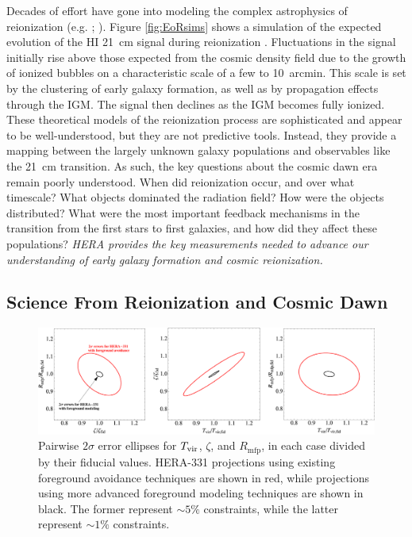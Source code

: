 \documentclass[preprint]{aastex}
\newcommand{\Mycitep}[1]{{\bf \citep{#1}}}
\newcommand{\Mycitealt}[1]{{\bf \citealt{#1}}}
\newcommand{\compress}{\vspace{-0.25in}}
\newcommand{\Caption}[4]{\vspace{#1}\renewcommand{\baselinestretch}{#2}\caption{#4}\vspace{#3}}
\begin{document}
Decades of effort have gone into modeling the complex astrophysics of reionization
(e.g. \citealt{shapiro_giroux1987, haiman_loeb1997}; \Mycitealt{furlanetto_et_al2004, santos_et_al2010}). Figure \ref{fig:EoRsims} shows a 
simulation of the expected evolution of the HI 21~cm signal during reionization \Mycitep{mesinger_furlanetto2007}. Fluctuations in the signal initially 
rise above those expected from the cosmic density field due to the growth of ionized bubbles on a characteristic 
scale of a few to 10~arcmin. This scale is set by the clustering of early galaxy formation, as well as by 
propagation effects through the IGM. The signal then declines as the IGM becomes fully ionized.  These theoretical 
models of the reionization process are sophisticated and appear to be well-understood, but they are not 
predictive tools. Instead, they provide a mapping between the largely unknown galaxy populations and observables 
like the 21~cm transition. As such, the key questions about the cosmic dawn era remain poorly understood.  When 
did reionization occur, and over what timescale?  What objects dominated the radiation field?  How were the 
objects distributed?  What were the most important feedback mechanisms in the transition from the first stars to
first galaxies, and how did they affect these populations?  {\it HERA provides the key measurements needed 
to advance our understanding of early galaxy formation and cosmic reionization.}



\compress
\subsection{Science From Reionization and Cosmic Dawn} %
\label{sec:science}

\begin{figure}[t]\centering
\includegraphics[width=\textwidth]{plots/Pspec/OPTMIDellipses.pdf}
\Caption{-0.3in}{0.99}{-0.15in}{\small
Pairwise $2\sigma$ error ellipses for $T_{\rm vir}$, $\zeta$, and $R_\textrm{mfp}$, in each case divided by their fiducial values.  HERA-331 projections using existing foreground avoidance techniques are shown in red, while projections using more advanced foreground modeling techniques are shown in black.  The former represent $\sim 5\%$ constraints, while the latter represent $\sim 1\%$ constraints.\label{fig:ErrorEllipses}}
\end{figure}
\end{document}

